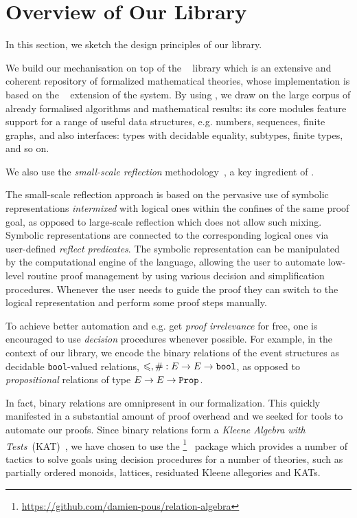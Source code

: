 \section{Overview of Our Library}

In this section, we sketch the design principles of our library. 

We build our mechanisation on top of the \mathcomp~\cite{Mahboubi-Tassi:MATHCOMP17} library 
which is an extensive and coherent repository of formalized mathematical theories,
whose implementation is based on the \ssreflect~\cite{Gonthier-al:SSR2016} extension of the \coq system.
By using \mathcomp, we draw on the large corpus of already formalised algorithms and mathematical results:
its core modules feature support for a range of useful data structures,
e.g. numbers, sequences, finite graphs,
and also interfaces: types with decidable equality, subtypes, finite types, and so on.

We also use the \emph{small-scale reflection} 
methodology~\cite{Gonthier-Assia:SSR2010, Gonthier-al:SSR2016}, 
a key ingredient of \ssreflect. 

The small-scale reflection approach is based on 
the pervasive use of symbolic representations \emph{intermixed}
with logical ones within the confines of the same proof goal,
as opposed to large-scale reflection which does not allow such mixing.
Symbolic representations are connected to the corresponding logical ones
via user-defined \emph{reflect predicates}.
The symbolic representation can be manipulated 
by the computational engine of the language, 
allowing the user to automate low-level routine 
proof management by using various decision 
and simplification procedures.
Whenever the user needs to guide the proof 
they can switch to the logical representation
and perform some proof steps manually. 

To achieve better automation and e.g. get \emph{proof irrelevance}
for free, one is encouraged
to use \emph{decision} procedures whenever possible.
For example, in the context of our library, 
we encode the binary relations of the event structures
as decidable \texttt{bool}-valued relations, 
\ie $\leqslant, \# : E \rightarrow E \rightarrow \texttt{bool}$,
as opposed to \emph{propositional} 
relations of type $E \rightarrow E \rightarrow \texttt{Prop}$. 

In fact, binary relations are omnipresent in our formalization.
This quickly manifested in a substantial amount of proof overhead and
we seeked for tools to automate our proofs.
Since binary relations form a \emph{Kleene Algebra with Tests}~(KAT)~\cite{Kozen:TOPLAS:1997},
we have chosen to use the \relationalgebra%
\footnote{\url{https://github.com/damien-pous/relation-algebra}}~%
\cite{Pous-ITP2013} package 
which provides a number of tactics to solve goals using
decision procedures for a number of theories, such as
partially ordered monoids, lattices, residuated Kleene allegories and KATs.


